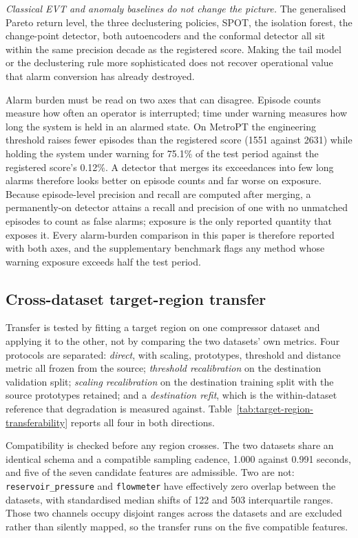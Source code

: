 \emph{Classical EVT and anomaly baselines do not change the picture.} The generalised Pareto return level, the three declustering policies, SPOT, the isolation forest, the change-point detector, both autoencoders and the conformal detector all sit within the same precision decade as the registered score. Making the tail model or the declustering rule more sophisticated does not recover operational value that alarm conversion has already destroyed.

Alarm burden must be read on two axes that can disagree. Episode counts measure how often an operator is interrupted; time under warning measures how long the system is held in an alarmed state. On MetroPT the engineering threshold raises fewer episodes than the registered score (1551 against 2631) while holding the system under warning for 75.1\% of the test period against the registered score's 0.12\%. A detector that merges its exceedances into few long alarms therefore looks better on episode counts and far worse on exposure. Because episode-level precision and recall are computed after merging, a permanently-on detector attains a recall and precision of one with no unmatched episodes to count as false alarms; exposure is the only reported quantity that exposes it. Every alarm-burden comparison in this paper is therefore reported with both axes, and the supplementary benchmark flags any method whose warning exposure exceeds half the test period.

\subsection{Cross-dataset target-region transfer}
\label{sec:transfer}

Transfer is tested by fitting a target region on one compressor dataset and applying it to the other, not by comparing the two datasets' own metrics. Four protocols are separated: \emph{direct}, with scaling, prototypes, threshold and distance metric all frozen from the source; \emph{threshold recalibration} on the destination validation split; \emph{scaling recalibration} on the destination training split with the source prototypes retained; and a \emph{destination refit}, which is the within-dataset reference that degradation is measured against. Table~\ref{tab:target-region-transferability} reports all four in both directions.

Compatibility is checked before any region crosses. The two datasets share an identical schema and a compatible sampling cadence, 1.000 against 0.991 seconds, and five of the seven candidate features are admissible. Two are not: \texttt{reservoir\_pressure} and \texttt{flowmeter} have effectively zero overlap between the datasets, with standardised median shifts of 122 and 503 interquartile ranges. Those two channels occupy disjoint ranges across the datasets and are excluded rather than silently mapped, so the transfer runs on the five compatible features.

